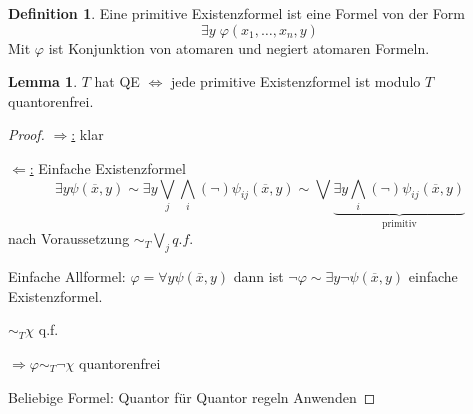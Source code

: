 \documentclass[12pt,parskip=full]{scrartcl}
\newcommand{\heading}{\underline}
\theoremstyle{definition}
\newtheorem{lemma}[theorem]{Lemma}
\newtheorem{definition}[theorem]{Definition}
\begin{document}
	\begin{definition}
		Eine primitive Existenzformel ist eine Formel von der Form
		\begin{equation*}
			\exists y \; \varphi(x_1, \dots, x_n, y)
		\end{equation*}
		Mit $\varphi$ ist Konjunktion von atomaren und negiert atomaren Formeln.
	\end{definition}

	\begin{lemma}
		$T$ hat QE $\Leftrightarrow$ jede primitive Existenzformel ist modulo $T$ quantorenfrei.
	\end{lemma}

	\begin{proof}
		\heading{$\Rightarrow$:} klar
		
		\heading{$\Leftarrow$:} Einfache Existenzformel
		\begin{equation}
			\exists y \psi(\overline{x}, y) \sim \exists y \bigvee_j \bigwedge_i (\lnot) \psi_{ij}(\overline{x}, y) \sim \bigvee \underbrace{\exists y \bigwedge_i (\lnot) \psi_{ij}(\overline{x}, y)}_\text{primitiv}
 		\end{equation}
 		nach Voraussetzung $\sim_T \bigvee_j q.f.$
 		
 		Einfache Allformel: $\varphi = \forall y \psi(\overline{x}, y)$ dann ist $\lnot \varphi \sim \exists
 		 y \lnot \psi(\overline{x}, y)$ einfache Existenzformel.
 		 
 		$\sim_T \chi$ q.f.
 		
 		$\Rightarrow \varphi \sim_T \lnot \chi$ quantorenfrei
 		
 		Beliebige Formel: Quantor für Quantor regeln Anwenden
	\end{proof}
\end{document}
